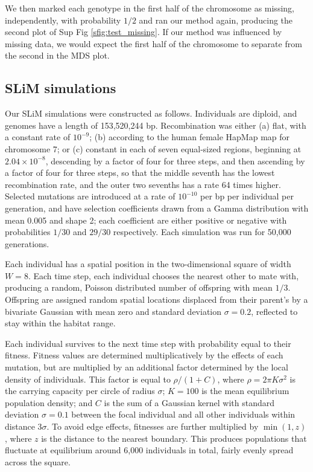 \documentclass[11pt, oneside]{article}   	%
\newcommand{\SFigure}{Sup Fig }
\newcommand{\SFigure}{{Supplementary Figure }}
\renewcommand{\llabel}[1]{\relax}
\begin{document}
We then marked each genotype in the first half of the chromosome
as missing, independently, with probability $1/2$ and ran our method again,
producing the second plot of \SFigure \ref{sfig:test_missing}. \llabel{ll:test_missing}
If our method was influenced by missing data,
we would expect the first half of the chromosome to separate from the second
in the MDS plot.

\subsection{SLiM simulations}
\label{apx:slim_sims}

Our SLiM simulations were constructed as follows.
Individuals are diploid, and genomes have a length of 153,520,244 bp.
Recombination was either 
(a) flat, with a constant rate of $10^{-9}$;
(b) according to the human female HapMap map for chromosome 7;
or (c) constant in each of seven equal-sized regions, beginning at $2.04\times 10^{-8}$,
descending by a factor of four for three steps, and then ascending by a factor of four for three steps,
so that the middle seventh has the lowest recombination rate,
and the outer two sevenths has a rate 64 times higher.
Selected mutations are introduced at a rate of $10^{-10}$ per bp per individual per generation,
and have selection coefficients drawn from a Gamma distribution with mean 0.005 and shape 2;
each coefficient are either positive or negative with probabilities $1/30$ and $29/30$ respectively.
Each simulation was run for 50,000 generations.

Each individual has a spatial position in the two-dimensional square of width $W=8$.
Each time step, each individual chooses the nearest other to mate with,             
producing a random, Poisson distributed number of offspring with mean $1/3$.
Offspring are assigned random spatial locations displaced from their parent's
by a bivariate Gaussian with mean zero and standard deviation $\sigma = 0.2$,
reflected to stay within the habitat range.

Each individual survives to the next time step
with probability equal to their fitness.
Fitness values are determined multiplicatively by the effects of each mutation,
but are multiplied by an additional factor determined by the local density of individuals.
This factor is equal to $\rho / (1 + C)$,
where $\rho = 2 \pi K \sigma^2$ is the carrying capacity per circle of radius $\sigma$;
$K=100$ is the mean equilibrium population density;
and $C$ is the sum of a Gaussian kernel with standard deviation $\sigma = 0.1$
between the focal individual and all other individuals within distance $3 \sigma$.
To avoid edge effects, fitnesses are further multiplied by $\min(1, z)$,
where $z$ is the distance to the nearest boundary.
This produces populations that fluctuate at equilibrium around 6,000 individuals in total,
fairly evenly spread across the square.
\end{document}
